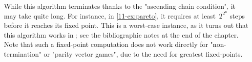 While this algorithm terminates thanks to the "ascending chain
condition", it may take quite long.  For instance, in
\cref{11-ex:pareto}, it requires at least~$2^{2^n}$ steps before it
reaches its fixed point.  This is a worst-case instance, as it turns
out that this algorithm works in \kEXP[2]; see the bibliographic notes
at the end of the chapter.  Note that such a
fixed-point computation does not work directly for "non-termination"
or "parity vector games", due to the need for greatest fixed-points.

